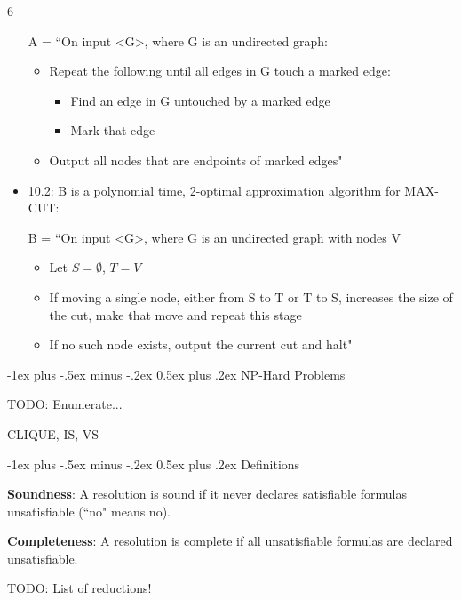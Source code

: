 \documentclass[2pt]{scrartcl}
\makeatletter
\renewcommand{\section}{\@startsection{section}{1}{0mm}
  {-1ex plus -.5ex minus -.2ex}
  {0.5ex plus .2ex}
{\normalfont\large\bfseries}}
\makeatother
\begin{document}
\begin{multicols}{6}
\begin{itemize}
            A = ``On input <G>, where G is an undirected graph:
            \begin{itemize}
                \item Repeat the following until all edges in G touch a marked edge:
                \begin{itemize}
                    \item Find an edge in G untouched by a marked edge
                    \item Mark that edge
                \end{itemize}
                 \item Output all nodes that are endpoints of marked edges"
            \end{itemize}

        \item 10.2: B is a polynomial time, 2-optimal approximation algorithm for MAX-CUT:
            
            B = ``On input <G>, where G is an undirected graph with nodes V
            \begin{itemize}
                \item Let $S = \emptyset$, $T = V$
                \item If moving a single node, either from S to T or T to S, increases the size of the cut, make that move and repeat this stage
                \item If no such node exists, output the current cut and halt"
            \end{itemize}
  \end{itemize}


  \section{NP-Hard Problems}

  TODO: Enumerate...

  CLIQUE, IS, VS

  \section{Definitions}

  {\bf Soundness}: A resolution is sound if it never declares satisfiable formulas unsatisfiable (``no" means no).

  {\bf Completeness}: A resolution is complete if all unsatisfiable formulas are declared unsatisfiable.

  TODO: List of reductions!


\end{multicols}
\end{document}
